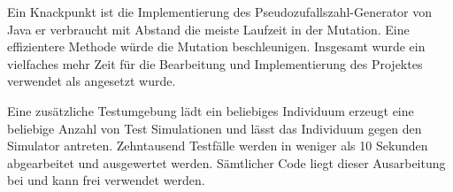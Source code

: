 Ein Knackpunkt ist die Implementierung des Pseudozufallszahl-Generator von Java er verbraucht mit Abstand die meiste Laufzeit in der Mutation. Eine effizientere Methode würde die Mutation beschleunigen. Insgesamt wurde ein vielfaches mehr Zeit für die Bearbeitung und Implementierung des Projektes verwendet als angesetzt wurde.

Eine zusätzliche Testumgebung lädt ein beliebiges Individuum erzeugt eine beliebige Anzahl von Test Simulationen und lässt das Individuum gegen den Simulator antreten. Zehntausend Testfälle werden in weniger als 10 Sekunden abgearbeitet und ausgewertet werden. Sämtlicher Code liegt dieser Ausarbeitung bei und kann frei verwendet werden.